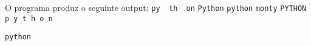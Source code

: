 \documentclass[12pt,varwidth=16cm,border=1pt]{standalone}
\begin{document}
O programa produz o seguinte output:
\newline 
\verb+py  th  on+ \newline
\verb+Python+ \newline
\verb+python+ \verb+monty+ \newline
\verb+PYTHON+ \newline
\verb+p y t h o n+ \newline

\verb+python+
\end{document}
